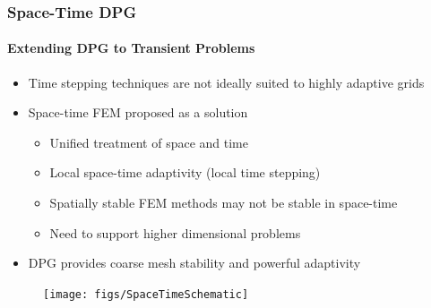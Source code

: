 \documentclass[18pt,xcolor=table]{beamer}
\begin{document}
\begin{frame}[t]
\frametitle{Space-Time DPG}
\framesubtitle{Extending DPG to Transient Problems}
\begin{itemize}
  \item Time stepping techniques are not ideally suited to highly adaptive grids
  \item Space-time FEM proposed as a solution
  \begin{itemize}
    \item[\textcolor{green}{\Checkmark}] Unified treatment of space and time
    \item[\textcolor{green}{\Checkmark}] Local space-time adaptivity (local time stepping)
    \item[\XSolidBrush] Spatially stable FEM methods may not be stable in space-time
    \item[\XSolidBrush] Need to support higher dimensional problems
  \end{itemize}
  \item DPG provides coarse mesh stability and powerful adaptivity
\end{itemize}
\begin{figure}[b]
\centering
\texttt{[image: figs/SpaceTimeSchematic]}
\end{figure}

\end{frame}
\end{document}
